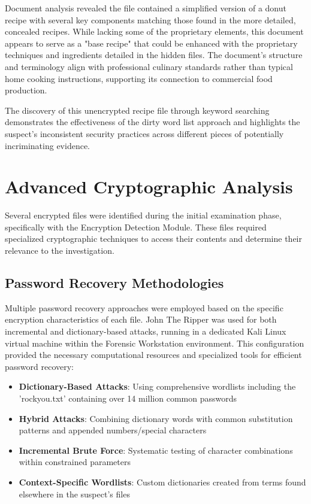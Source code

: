Document analysis revealed the file contained a simplified version of a donut recipe with several key components matching those found in the more detailed, concealed recipes. While lacking some of the proprietary elements, this document appears to serve as a "base recipe" that could be enhanced with the proprietary techniques and ingredients detailed in the hidden files. The document's structure and terminology align with professional culinary standards rather than typical home cooking instructions, supporting its connection to commercial food production.

The discovery of this unencrypted recipe file through keyword searching demonstrates the effectiveness of the dirty word list approach and highlights the suspect's inconsistent security practices across different pieces of potentially incriminating evidence.

\section{Advanced Cryptographic Analysis}
Several encrypted files were identified during the initial examination phase, specifically with the Encryption Detection Module. These files required specialized cryptographic techniques to access their contents and determine their relevance to the investigation.

\subsection{Password Recovery Methodologies}
Multiple password recovery approaches were employed based on the specific encryption characteristics of each file. John The Ripper was used for both incremental and dictionary-based attacks, running in a dedicated Kali Linux virtual machine within the Forensic Workstation environment. This configuration provided the necessary computational resources and specialized tools for efficient password recovery:

\begin{itemize}
    \item \textbf{Dictionary-Based Attacks}: Using comprehensive wordlists including the 'rockyou.txt' containing over 14 million common passwords
    \item \textbf{Hybrid Attacks}: Combining dictionary words with common substitution patterns and appended numbers/special characters
    \item \textbf{Incremental Brute Force}: Systematic testing of character combinations within constrained parameters
    \item \textbf{Context-Specific Wordlists}: Custom dictionaries created from terms found elsewhere in the suspect's files
\end{itemize}

